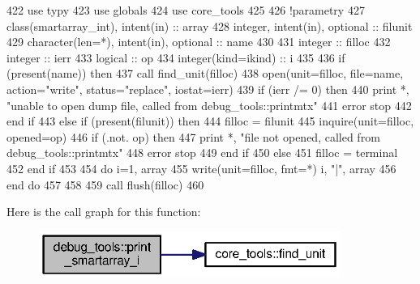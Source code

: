 \begin{DoxyCode}
422       \textcolor{keywordtype}{use }typy
423       \textcolor{keywordtype}{use }globals
424       \textcolor{keywordtype}{use }core_tools
425       
426       \textcolor{comment}{!parametry}
427       \textcolor{keywordtype}{class}(smartarray_int), \textcolor{keywordtype}{intent(in)} :: array
428       \textcolor{keywordtype}{integer}, \textcolor{keywordtype}{intent(in)}, \textcolor{keywordtype}{optional} :: filunit   
429       \textcolor{keywordtype}{character(len=*)}, \textcolor{keywordtype}{intent(in)}, \textcolor{keywordtype}{optional} :: name
430 
431       \textcolor{keywordtype}{integer} :: filloc
432       \textcolor{keywordtype}{integer} :: ierr
433       \textcolor{keywordtype}{logical} :: op
434       \textcolor{keywordtype}{integer(kind=ikind)} :: i
435       
436       \textcolor{keywordflow}{if} (\textcolor{keyword}{present}(name)) \textcolor{keywordflow}{then}
437         \textcolor{keyword}{call }find_unit(filloc)
438         \textcolor{keyword}{open}(unit=filloc, file=name, action=\textcolor{stringliteral}{"write"}, status=\textcolor{stringliteral}{"replace"}, iostat\textcolor{comment}{=ierr)}
439 \textcolor{comment}{        }\textcolor{keywordflow}{if} (ierr /= 0) \textcolor{keywordflow}{then}
440           print *, \textcolor{stringliteral}{"unable to open dump file, called from debug\_tools::printmtx"}
441           error stop
442 \textcolor{keywordflow}{        end if}
443       \textcolor{keywordflow}{else} \textcolor{keywordflow}{if} (\textcolor{keyword}{present}(filunit)) \textcolor{keywordflow}{then}
444         filloc = filunit
445         \textcolor{keyword}{inquire}(unit=filloc, opened=op)
446         \textcolor{keywordflow}{if} (.not. op) \textcolor{keywordflow}{then}
447           print *, \textcolor{stringliteral}{"file not opened, called from debug\_tools::printmtx"}
448           error stop
449 \textcolor{keywordflow}{        end if}
450       \textcolor{keywordflow}{else}
451         filloc = terminal
452 \textcolor{keywordflow}{      end if}
453       
454       \textcolor{keywordflow}{do} i=1, array%
455         \textcolor{keyword}{write}(unit=filloc, fmt=*)  i, \textcolor{stringliteral}{"|"}, array%
456 \textcolor{keywordflow}{      end do}
457 
458       
459       \textcolor{keyword}{call }flush(filloc)
460       
\end{DoxyCode}


Here is the call graph for this function\+:\nopagebreak
\begin{figure}[H]
\begin{center}
\leavevmode
\includegraphics[width=278pt]{namespacedebug__tools_a449ad1a14227bae826cb53afd9f4ea9c_cgraph}
\end{center}
\end{figure}


